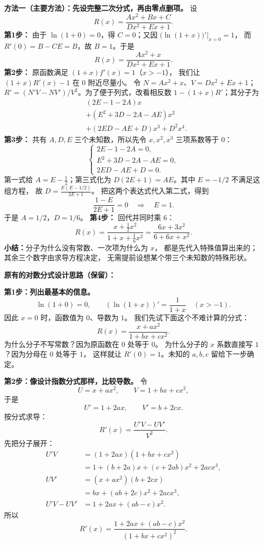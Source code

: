 \begin{proofbox}
\medskip
\noindent\textbf{方法一（主要方法）：先设完整二次分式，再由零点删项。}
设
\[
 R(x)=\frac{Ax^2+Bx+C}{Dx^2+Ex+1}.
\]
\textbf{第1步：} 由于 $\ln(1+0)=0$，得 $C=0$；又因
$\bigl(\ln(1+x)\bigr)'\big|_{x=0}=1$，
而 $R'(0)=B-CE=B$，故 $B=1$。于是
\[
 R(x)=\frac{Ax^2+x}{Dx^2+Ex+1}.
\]
\textbf{第2步：} 原函数满足 $(1+x)f'(x)=1$（$x>-1$），
我们让 $(1+x)R'(x)-1$ 在 $0$ 附近尽量小。
令 $N=Ax^2+x$、$V=Dx^2+Ex+1$；
$R'=(N'V-NV')/V^2$。为了便于列式，改看相反数
$1-(1+x)R'$；其分子为
\[
 \begin{aligned}
 &(2E-1-2A)x\\
 &+(E^2+3D-2A-AE)x^2\\
 &+(2ED-AE+D)x^3+D^2x^4.
 \end{aligned}
\]
\textbf{第3步：} 共有 $A,D,E$ 三个未知数，所以先令 $x,x^2,x^3$ 三项系数等于 $0$：
\[
 \begin{cases}
 2E-1-2A=0,\\
 E^2+3D-2A-AE=0,\\
 2ED-AE+D=0.
 \end{cases}
\]
第一式给 $A=E-\frac12$；第三式化为
$D(2E+1)=AE$。其中 $E=-1/2$ 不满足这组方程，
故 $D=\frac{E(E-1/2)}{2E+1}$。
把这两个表达式代入第二式，得到
\[
 \frac{1-E}{2E+1}=0\quad\Longrightarrow\quad E=1.
\]
于是 $A=1/2$，$D=1/6$。
\textbf{第4步：} 回代并同时乘 $6$：
\[
 \boxed{R(x)=\frac{x+\frac12x^2}{1+x+\frac16x^2}
 =\frac{6x+3x^2}{6+6x+x^2}}.
\]
\textbf{小结：}分子为什么没有常数、一次项为什么为 $x$，
都是先代入特殊值算出来的；其余三个数字由求导方程决定，
无需提前设想某个带三个未知数的特殊形状。

\noindent\textbf{原有的对数分式设计思路（保留）：}

\textbf{第1步：列出最基本的信息。}
\[
 \ln(1+0)=0,\qquad (\ln(1+x))'=\frac1{1+x}\quad(x>-1).
\]
因此 $x=0$ 时，函数值为 $0$、导数为 $1$。
我们先试下面这个不难计算的分式：
\[
 R(x)=\frac{x+ax^2}{1+bx+cx^2}.
\]
为什么分子不写常数？因为原函数在 $0$ 处等于 $0$。
为什么分子的 $x$ 系数直接写 $1$？因为分母在 $0$ 处等于 $1$，
这样就让 $R'(0)=1$。未知的 $a,b,c$ 留给下一步确定。

\textbf{第2步：像设计指数分式那样，比较导数。}
令
\[
 U=x+ax^2,\qquad V=1+bx+cx^2,
\]
于是
\[
 U'=1+2ax,\qquad V'=b+2cx.
\]
按分式求导：
\[
 R'(x)=\frac{U'V-UV'}{V^2}.
\]
先把分子展开：
\[
\begin{aligned}
 U'V&=(1+2ax)(1+bx+cx^2)\\
 &=1+(b+2a)x+(c+2ab)x^2+2acx^3,\\
 UV'&=(x+ax^2)(b+2cx)\\
 &=bx+(ab+2c)x^2+2acx^3,\\
 U'V-UV'&=1+2ax+(ab-c)x^2.
\end{aligned}
\]
所以
\[
 \boxed{R'(x)=\frac{1+2ax+(ab-c)x^2}{(1+bx+cx^2)^2}}.
\]


\end{proofbox}
